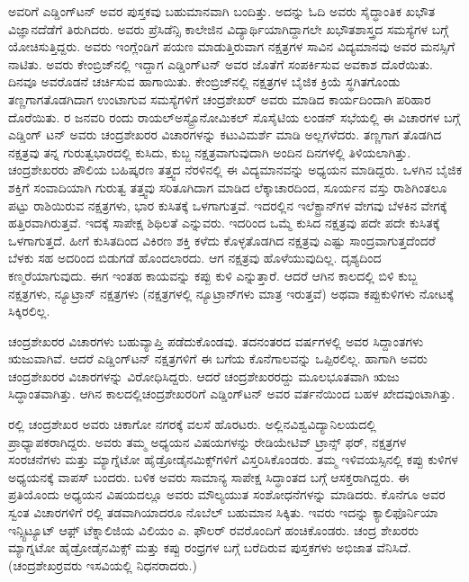ಅವರಿಗೆ ಎಡ್ಡಿಂಗ್‍ಟನ್ ಅವರ ಪುಸ್ತಕವು ಬಹುಮಾನವಾಗಿ ಬಂದಿತ್ತು. ಅದನ್ನು ಓದಿ ಅವರು ಸೈದ್ಧಾಂತಿಕ ಖಭೌತ ವಿಜ್ಞಾನದೆಡೆಗೆ ತಿರುಗಿದರು. ಅವರು ಪ್ರೆಸಿಡೆನ್ಸಿ ಕಾಲೇಜಿನ ವಿದ್ಯಾರ್ಥಿಯಾಗಿ\-ದ್ದಾಗಲೇ ಖಭೌತಶಾಸ್ತ್ರದ ಸಮಸ್ಯೆಗಳ ಬಗ್ಗೆ ಯೋಚಿಸುತ್ತಿದ್ದರು. ಅವರು ಇಂಗ್ಲೆಂಡಿಗೆ ಪಯಣ ಮಾಡುತ್ತಿರುವಾಗ ನಕ್ಷತ್ರಗಳ ಸಾವಿನ ವಿದ್ಯಮಾನವು ಅವರ ಮನಸ್ಸಿಗೆ ನಾಟಿತು. ಅವರು ಕೇಂಬ್ರಿಜ್‍ನಲ್ಲಿ ಇದ್ದಾಗ ಎಡ್ಡಿಂಗ್‌ಟನ್ ಅವರ ಜೊತೆಗೆ ಸಂಪರ್ಕಿಸುವ ಅವಕಾಶ ದೊರೆಯಿತು. ದಿನವೂ ಅವರೊಡನೆ ಚರ್ಚಿಸುವ ಹಾಗಾಯಿತು. ಕೇಂಬ್ರಿಜ್‍ನಲ್ಲಿ ನಕ್ಷತ್ರಗಳ ಬೈಜಿಕ ಕ್ರಿಯೆ ಸ್ಥಗಿತಗೊಂಡು ತಣ್ಣಗಾಗತೊಡಗಿದಾಗ ಉಂಟಾಗುವ ಸಮಸ್ಯೆಗಳಿಗೆ ಚಂದ್ರಶೇಖರ್ ಅವರು ಮಾಡಿದ ಕಾರ್ಯದಿಂದಾಗಿ ಪರಿಹಾರ ದೊರೆಯಿತು. ರ ಜನವರಿ ರಂದು ರಾಯಲ್\break ಅಸ್ಟ್ರೊನೋಮಿಕಲ್ ಸೊಸೈಟಿಯ ಲಂಡನ್ ಸಭೆಯಲ್ಲಿ ಈ ವಿಚಾರಗಳ ಬಗ್ಗೆ ಎಡ್ಡಿಂಗ್ ಟನ್ ಅವರು ಚಂದ್ರಶೇಖರರ ವಿಚಾರಗಳನ್ನು ಕಟುವಿಮರ್ಶೆ ಮಾಡಿ ಅಲ್ಲಗಳೆದರು. ತಣ್ಣಗಾಗ ತೊಡಗಿದ ನಕ್ಷತ್ರವು ತನ್ನ ಗುರುತ್ವಭಾರದಲ್ಲಿ ಕುಸಿದು, ಕುಬ್ಜ ನಕ್ಷತ್ರವಾಗುವುದಾಗಿ ಅಂದಿನ ದಿನಗಳಲ್ಲಿ ತಿಳಿಯಲಾಗಿತ್ತು. ಚಂದ್ರಶೇಖರರು ಪೌಲಿಯ ಬಹಿಷ್ಕರಣ ತತ್ತ್ವದ ನೆರಳಿನಲ್ಲಿ ಈ ವಿದ್ಯಮಾನವನ್ನು ಅಧ್ಯಯನ ಮಾಡಿದ್ದರು. ಒಳಗಿನ ಬೈಜಿಕ ಶಕ್ತಿಗೆ ಸಂವಾದಿಯಾಗಿ ಗುರುತ್ವ ತತ್ತ್ವವು ಸರಿತೂಗಿದಾಗ ಮಾಡಿದ ಲೆಕ್ಕಾಚಾರದಿಂದ, ಸೂರ್ಯನ ವಸ್ತು ರಾಶಿಗಿಂತಲೂ  ಪಟ್ಟು ರಾಶಿಯಿರುವ ನಕ್ಷತ್ರಗಳು, ಭಾರ ಕುಸಿತಕ್ಕೆ ಒಳಗಾಗುತ್ತವೆ. ಇದರಲ್ಲಿನ ಇಲೆಕ್ಟ್ರಾನ್‍ಗಳ ವೇಗವು ಬೆಳಕಿನ ವೇಗಕ್ಕೆ ಹತ್ತಿರವಾಗಿರುತ್ತವೆ. ಇದಕ್ಕೆ ಸಾಪೇಕ್ಷ ಶಿಥಿಲತೆ ಎನ್ನುವರು. ಇದರಿಂದ ಒಮ್ಮೆ ಕುಸಿದ ನಕ್ಷತ್ರವು ಪದೇ ಪದೇ ಕುಸಿತಕ್ಕೆ ಒಳಗಾಗುತ್ತದೆ. ಹೀಗೆ ಕುಸಿತದಿಂದ ವಿಕಿರಣ ಶಕ್ತಿ ಕಳೆದು ಕೊಳ್ಳತೊಡಗಿದ ನಕ್ಷತ್ರವು ಎಷ್ಟು ಸಾಂದ್ರವಾಗುತ್ತದೆಂದರೆ ಬೆಳಕು ಸಹ ಅದರಿಂದ ಬಿಡುಗಡೆ ಹೊಂದಲಾರದು. ಆಗ ನಕ್ಷತ್ರವು ಹೊಳೆಯುವುದಿಲ್ಲ. ದೃಶ್ಯದಿಂದ ಕಣ್ಮರೆಯಾಗುವುದು. ಈಗ ಇಂತಹ ಕಾಯವನ್ನು ಕಪ್ಪು ಕುಳಿ ಎನ್ನುತ್ತಾರೆ. ಆದರೆ ಆಗಿನ ಕಾಲದಲ್ಲಿ ಬಿಳಿ ಕುಬ್ಜ ನಕ್ಷತ್ರಗಳು, ನ್ಯೂಟ್ರಾನ್ ನಕ್ಷತ್ರಗಳು (ನಕ್ಷತ್ರಗಳಲ್ಲಿ ನ್ಯೂಟ್ರಾನ್‍ಗಳು ಮಾತ್ರ ಇರುತ್ತವೆ) ಅಥವಾ ಕಪ್ಪುಕುಳಿಗಳು ನೋಟಕ್ಕೆ ಸಿಕ್ಕಿರಲಿಲ್ಲ.

ಚಂದ್ರಶೇಖರರ ವಿಚಾರಗಳು ಬಹುವ್ಯಾಪ್ತಿ ಪಡೆದುಕೊಂಡವು. ತದನಂತರದ ವರ್ಷಗಳಲ್ಲಿ ಅವರ ಸಿದ್ದಾಂತಗಳು ಋಜುವಾಗಿವೆ. ಆದರೆ ಎಡ್ಡಿಂಗ್‍ಟನ್ ನಕ್ಷತ್ರಗಳಿಗೆ ಈ ಬಗೆಯ ಕೊನೆಗಾಲವನ್ನು ಒಪ್ಪಿರಲಿಲ್ಲ. ಹಾಗಾಗಿ ಅವರು ಚಂದ್ರಶೇಖರರ ವಿಚಾರಗಳನ್ನು ವಿರೋಧಿಸಿದ್ದರು. ಆದರೆ ಚಂದ್ರಶೇಖರರದ್ದು ಮೂಲಭೂತವಾಗಿ ಋಜು ಸಿದ್ಧಾಂತವಾಗಿತ್ತು. ಆಗಿನ ಕಾಲದಲ್ಲಿ\break ಚಂದ್ರಶೇಖರರಿಗೆ ಎಡ್ಡಿಂಗ್‍ಟನ್ ಅವರ ವರ್ತನೆಯಿಂದ ಬಹಳ ಖೇದವುಂಟಾಗಿತ್ತು.

ರಲ್ಲಿ ಚಂದ್ರಶೇಖರ ಅವರು ಚಿಕಾಗೋ ನಗರಕ್ಕೆ ವಲಸೆ ಹೊರಟರು. ಅಲ್ಲಿನ\break ವಿಶ್ವವಿದ್ಯಾನಿಲಯದಲ್ಲಿ ಪ್ರಾಧ್ಯಾಪಕರಾಗಿದ್ದರು. ಅವರು ತಮ್ಮ ಅಧ್ಯಯನ ವಿಷಯಗಳನ್ನು ರೇಡಿಯೇಟಿವ್ ಟ್ರಾನ್ಸ್ ಫರ್, ನಕ್ಷತ್ರಗಳ ಸಂರಚನೆಗಳು ಮತ್ತು ಮ್ಯಾಗ್ನೆಟೋ ಹೈಡ್ರೋಡೈನಮಿಕ್ಸ್‌ಗಳಿಗೆ ವಿಸ್ತರಿಸಿಕೊಂಡರು. ತಮ್ಮ ಇಳಿವಯಸ್ಸಿನಲ್ಲಿ ಕಪ್ಪು ಕುಳಿಗಳ ಅಧ್ಯಯನಕ್ಕೆ ವಾಪಸ್ ಬಂದರು. ಬಳಿಕ ಅವರು ಸಾಮಾನ್ಯ ಸಾಪೇಕ್ಷ ಸಿದ್ಧಾಂತದ ಬಗ್ಗೆ ಆಸಕ್ತರಾಗಿದ್ದರು. ಈ ಪ್ರತಿಯೊಂದು ಅಧ್ಯಯನ ವಿಷಯದಲ್ಲೂ ಅವರು ಮೌಲ್ಯಯುತ ಸಂಶೋಧನೆಗಳನ್ನು ಮಾಡಿದರು. ಕೊನೆಗೂ ಅವರ ಸ್ವಂತ ವಿಚಾರಗಳಿಗೆ ರಲ್ಲಿ ತಡವಾಗಿಯಾದರೂ ನೊಬೆಲ್ ಬಹುಮಾನ ಸಿಕ್ಕಿತು. ಇವರು ಇದನ್ನು ಕ್ಯಾಲಿಫೊರ್ನಿಯಾ ಇನ್ಸ್ಟಿಟ್ಯೂಟ್ ಆಫ಼್ ಟೆಕ್ನಾಲಿಜಿಯ ವಿಲಿಯಂ ಎ. ಫೌಲರ್ ರವರೊಂದಿಗೆ ಹಂಚಿಕೊಂಡರು. ಚಂದ್ರ ಶೇಖರರು ಮ್ಯಾಗ್ನಟೋ ಹೈಡ್ರೋಡೈನಮಿಕ್ಸ್ ಮತ್ತು ಕಪ್ಪು ರಂಧ್ರಗಳ ಬಗ್ಗೆ ಬರೆದಿರುವ ಪುಸ್ತಕಗಳು ಅಭಿಜಾತ ವೆನಿಸಿದೆ. (ಚಂದ್ರಶೇಖರ್‍ರವರು  ಇಸವಿಯಲ್ಲಿ ನಿಧನರಾದರು.)

